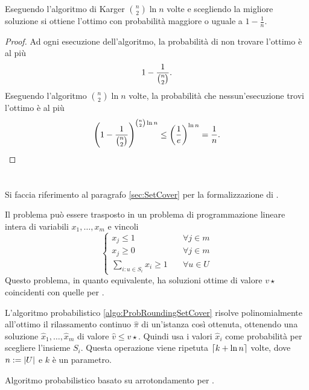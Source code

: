 \begin{corollario}
	Eseguendo l'algoritmo di Karger ${\binom{n}{2}}\ln n$ volte e scegliendo la migliore soluzione si ottiene l'ottimo con probabilità maggiore o uguale a $1-\frac{1}{n}$.
\end{corollario}
\begin{proof}
	Ad ogni esecuzione dell'algoritmo, la probabilità di non trovare l'ottimo è al più
	\begin{equation*}
		1-\frac{1}{\binom{n}{2}}\text.
	\end{equation*}
	Eseguendo l'algoritmo ${\binom{n}{2}}\ln n$ volte, la probabilità che nessun'esecuzione trovi l'ottimo è al più
	\begin{equation*}
		\left(1-\frac{1}{{\binom{n}{2}}}\right)^{{\binom{n}{2}}\ln n}\leq\left(\frac{1}{e}\right)^{\ln n}=\frac{1}{n}\text.
	\end{equation*}
\end{proof}



\section{\MinSetCover}
Si faccia riferimento al paragrafo \ref{sec:SetCover} per la formalizzazione di \MinSetCover.

Il problema può essere trasposto in un problema di programmazione lineare intera di variabili $x_1,\dots,x_m$ e vincoli
\begin{equation*}
	\begin{cases}
		x_j \leq 1                   & \quad \forall j\in m \\
		x_j \geq 0                   & \quad \forall j\in m \\
		\sum_{i:u\in S_i} x_i \geq 1 & \quad \forall u\in U
	\end{cases}
\end{equation*}
Questo problema, in quanto equivalente, ha soluzioni ottime di valore $v\star$ coincidenti con quelle per \MinSetCover.

L'algoritmo probabilistico \ref{algo:ProbRoundingSetCover} risolve polinomialmente all'ottimo il rilassamento continuo $\hat\pi$ di un'istanza così ottenuta, ottenendo una soluzione $\hat x_1,\dots,\hat x_m$ di valore $\hat v\leq v\star$.
Quindi usa i valori $\hat x_i$ come probabilità per scegliere l'insieme $S_i$.
Questa operazione viene ripetuta $\left\lceil k+\ln n \right\rceil$ volte, dove $n:=| U |$ e $k$ è un parametro.

\begin{algorithm}
	\caption{Algoritmo probabilistico basato su arrotondamento per \MinSetCover.}
	\label{algo:ProbRoundingSetCover}
	
\end{algorithm}

